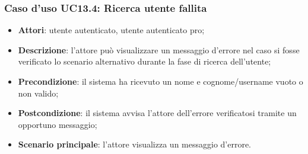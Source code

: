 \subsubsection{Caso d'uso UC13.4: Ricerca utente fallita}

\begin{itemize}
	\item \textbf{Attori}: utente autenticato, utente autenticato pro;
	\item \textbf{Descrizione}: l'attore può visualizzare un messaggio d'errore nel caso si fosse verificato lo scenario alternativo durante la fase di ricerca dell'utente;
	\item \textbf{Precondizione}: il sistema ha ricevuto un nome e cognome/username vuoto o non valido;
	\item \textbf{Postcondizione}: il sistema avvisa l'attore dell'errore verificatosi tramite un opportuno messaggio;
\item\textbf{Scenario principale}: l'attore visualizza un messaggio d'errore.
\end{itemize}